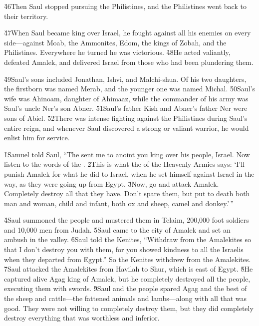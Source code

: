 \v{46}Then Saul stopped pursuing the Philistines, and the Philistines went back to their territory.

\v{47}When Saul became king over Israel, he fought against all his enemies on every side---against Moab, the Ammonites, Edom, the kings of Zobah, and the Philistines. Everywhere he turned he was victorious. \v{48}He acted valiantly, defeated Amalek, and delivered Israel from those who had been plundering them.

\v{49}Saul's sons included Jonathan, Ishvi, and Malchi-shua. Of his two daughters, the firstborn was named Merab, and the younger one was named Michal. \v{50}Saul's wife was Ahinoam, daughter of Ahimaaz, while the commander of his army was Saul's uncle Ner's son Abner. \v{51}Saul's father Kish and Abner's father Ner were sons of Abiel. \v{52}There was intense fighting against the Philistines during Saul's entire reign, and whenever Saul discovered a strong or valiant warrior, he would enlist him for service.

\v{1}Samuel told Saul, ``The  sent me to anoint you king over his people, Israel. Now listen to the words of the . \v{2}This is what the  of the Heavenly Armies says: `I'll punish Amalek for what he did to Israel, when he set himself against Israel in the way, as they were going up from Egypt. \v{3}Now, go and attack Amalek. Completely destroy all that they have. Don't spare them, but put to death both man and woman, child and infant, both ox and sheep, camel and donkey.'\,''

\v{4}Saul summoned the people and mustered them in Telaim, 200,000 foot soldiers and 10,000 men from Judah. \v{5}Saul came to the city of Amalek and set an ambush in the valley. \v{6}Saul told the Kenites, ``Withdraw from the Amalekites so that I don't destroy you with them, for you showed kindness to all the Israelis when they departed from Egypt.'' So the Kenites withdrew from the Amalekites. \v{7}Saul attacked the Amalekites from Havilah to Shur, which is east of Egypt. \v{8}He captured alive Agag king of Amalek, but he completely destroyed all the people, executing them with swords. \v{9}Saul and the people spared Agag and the best of the sheep and cattle---the fattened animals and lambs---along with all that was good. They were not willing to completely destroy them, but they did completely destroy everything that was worthless and inferior.

